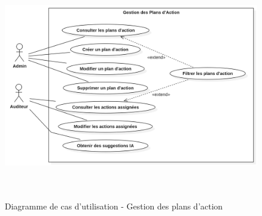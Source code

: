 \begin{figure}[H]
    \centering
    \includegraphics[width=14cm,height=10cm]{images/actionplansuc.png}
    \caption{Diagramme de cas d'utilisation - Gestion des plans d'action}
\end{figure}

